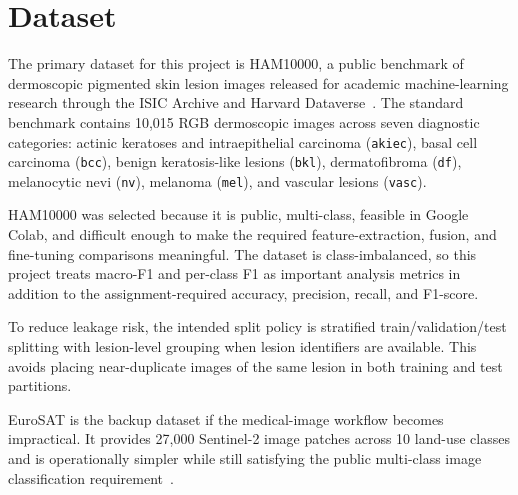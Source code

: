 \section{Dataset}

The primary dataset for this project is HAM10000, a public benchmark of dermoscopic pigmented skin lesion images released for academic machine-learning research through the ISIC Archive and Harvard Dataverse~\cite{tschandl2018ham10000,DVN/DBW86T_2018}. The standard benchmark contains 10,015 RGB dermoscopic images across seven diagnostic categories: actinic keratoses and intraepithelial carcinoma (\texttt{akiec}), basal cell carcinoma (\texttt{bcc}), benign keratosis-like lesions (\texttt{bkl}), dermatofibroma (\texttt{df}), melanocytic nevi (\texttt{nv}), melanoma (\texttt{mel}), and vascular lesions (\texttt{vasc}).

HAM10000 was selected because it is public, multi-class, feasible in Google Colab, and difficult enough to make the required feature-extraction, fusion, and fine-tuning comparisons meaningful. The dataset is class-imbalanced, so this project treats macro-F1 and per-class F1 as important analysis metrics in addition to the assignment-required accuracy, precision, recall, and F1-score.

To reduce leakage risk, the intended split policy is stratified train/validation/test splitting with lesion-level grouping when lesion identifiers are available. This avoids placing near-duplicate images of the same lesion in both training and test partitions.

EuroSAT is the backup dataset if the medical-image workflow becomes impractical. It provides 27,000 Sentinel-2 image patches across 10 land-use classes and is operationally simpler while still satisfying the public multi-class image classification requirement~\cite{helber2019eurosat}.
